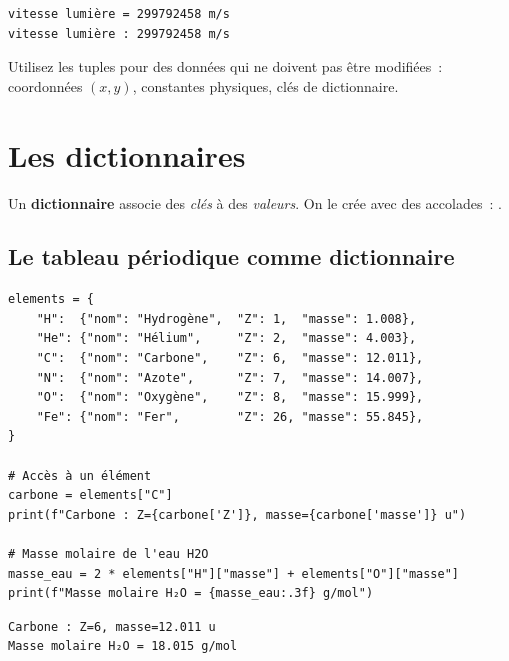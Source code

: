\begin{codeoutput}
\begin{verbatim}
vitesse lumière = 299792458 m/s
vitesse lumière : 299792458 m/s
\end{verbatim}
\end{codeoutput}

\begin{remarque}
Utilisez les tuples pour des donn\'ees qui ne doivent pas \^etre modifi\'ees~:
coordonn\'ees $(x, y)$, constantes physiques, cl\'es de dictionnaire.
\end{remarque}

\section{Les dictionnaires}

\begin{definition}[Dictionnaire]
Un \textbf{dictionnaire} associe des \emph{cl\'es} \`a des \emph{valeurs}.
On le cr\'ee avec des accolades~: .
\end{definition}

\subsection{Le tableau p\'eriodique comme dictionnaire}

\begin{codeblock}[title=\textbf{Python}]
\begin{verbatim}
elements = {
    "H":  {"nom": "Hydrogène",  "Z": 1,  "masse": 1.008},
    "He": {"nom": "Hélium",     "Z": 2,  "masse": 4.003},
    "C":  {"nom": "Carbone",    "Z": 6,  "masse": 12.011},
    "N":  {"nom": "Azote",      "Z": 7,  "masse": 14.007},
    "O":  {"nom": "Oxygène",    "Z": 8,  "masse": 15.999},
    "Fe": {"nom": "Fer",        "Z": 26, "masse": 55.845},
}

# Accès à un élément
carbone = elements["C"]
print(f"Carbone : Z={carbone['Z']}, masse={carbone['masse']} u")

# Masse molaire de l'eau H2O
masse_eau = 2 * elements["H"]["masse"] + elements["O"]["masse"]
print(f"Masse molaire H₂O = {masse_eau:.3f} g/mol")
\end{verbatim}
\end{codeblock}

\begin{codeoutput}
\begin{verbatim}
Carbone : Z=6, masse=12.011 u
Masse molaire H₂O = 18.015 g/mol
\end{verbatim}
\end{codeoutput}

